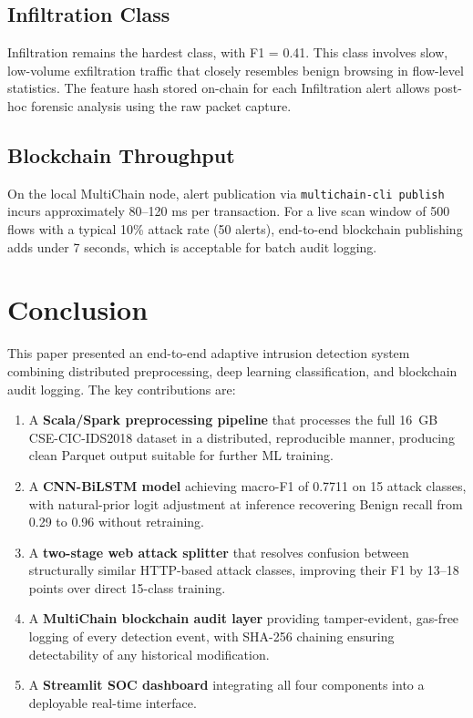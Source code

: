 \documentclass[12pt]{article}
\theoremstyle{plain}
\begin{document}
\subsection{Infiltration Class}

Infiltration remains the hardest class, with F1 = 0.41. This class involves slow, low-volume exfiltration traffic that closely resembles benign browsing in flow-level statistics. The feature hash stored on-chain for each Infiltration alert allows post-hoc forensic analysis using the raw packet capture.

\subsection{Blockchain Throughput}

On the local MultiChain node, alert publication via \texttt{multichain-cli publish} incurs approximately 80–120 ms per transaction. For a live scan window of 500 flows with a typical 10\% attack rate (50 alerts), end-to-end blockchain publishing adds under 7 seconds, which is acceptable for batch audit logging.

\newpage
\section{Conclusion}
\label{sec:conclusion}

This paper presented an end-to-end adaptive intrusion detection system combining distributed preprocessing, deep learning classification, and blockchain audit logging. The key contributions are:

\begin{enumerate}
  \item A \textbf{Scala/Spark preprocessing pipeline} that processes the full 16~GB CSE-CIC-IDS2018 dataset in a distributed, reproducible manner, producing clean Parquet output suitable for further ML training.
  \item A \textbf{CNN-BiLSTM model} achieving macro-F1 of 0.7711 on 15 attack classes, with natural-prior logit adjustment at inference recovering Benign recall from 0.29 to 0.96 without retraining.
  \item A \textbf{two-stage web attack splitter} that resolves confusion between structurally similar HTTP-based attack classes, improving their F1 by 13–18 points over direct 15-class training.
  \item A \textbf{MultiChain blockchain audit layer} providing tamper-evident, gas-free logging of every detection event, with SHA-256 chaining ensuring detectability of any historical modification.
  \item A \textbf{Streamlit SOC dashboard} integrating all four components into a deployable real-time interface.
\end{enumerate}
\end{document}
